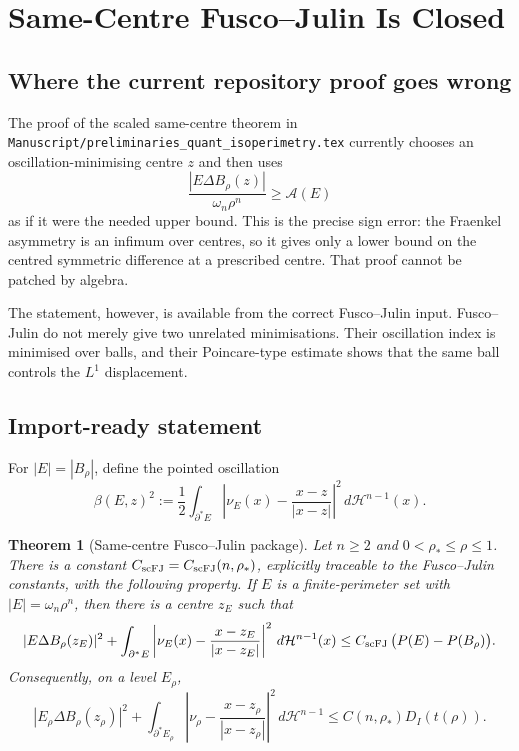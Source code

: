 \documentclass[11pt]{article}
\newtheorem{theorem}{Theorem}[section]
\theoremstyle{definition}
\newcommand{\Fr}{\mathcal A}
\newcommand{\HH}{\mathcal H}
\newcommand{\rstar}{\rho_*}
\begin{document}
\section{Same-Centre Fusco--Julin Is Closed}

\subsection{Where the current repository proof goes wrong}

The proof of the scaled same-centre theorem in
\texttt{Manuscript/preliminaries\_quant\_isoperimetry.tex} currently chooses
an oscillation-minimising centre \(z\) and then uses
\[
   \frac{|E\Delta B_\rho(z)|}{\omega_n\rho^n}\ge \Fr(E)
\]
as if it were the needed upper bound.  This is the precise sign error: the
Fraenkel asymmetry is an infimum over centres, so it gives only a lower bound
on the centred symmetric difference at a prescribed centre.  That proof
cannot be patched by algebra.

The statement, however, is available from the correct Fusco--Julin input.
Fusco--Julin do not merely give two unrelated minimisations.  Their
oscillation index is minimised over balls, and their Poincare-type estimate
shows that the same ball controls the \(L^1\) displacement.

\subsection{Import-ready statement}

For \(|E|=|B_\rho|\), define the pointed oscillation
\[
   \beta(E,z)^2
   :=
   \frac12\int_{\partial^*E}
   \left|\nu_E(x)-\frac{x-z}{|x-z|}\right|^2\,d\HH^{n-1}(x).
\]

\begin{theorem}[Same-centre Fusco--Julin package]\label{thm:scFJ}
Let \(n\ge2\) and \(0<\rstar\le\rho\le1\).  There is a constant
\(C_{\rm scFJ}=C_{\rm scFJ}(n,\rstar)\), explicitly traceable to the
Fusco--Julin constants, with the following property.  If
\(E\) is a finite-perimeter set with \(|E|=\omega_n\rho^n\), then there is a
centre \(z_E\) such that
\begin{equation}\label{eq:scFJ}
   |E\Delta B_\rho(z_E)|^2
   +
   \int_{\partial^*E}
   \left|\nu_E(x)-\frac{x-z_E}{|x-z_E|}\right|^2\,d\HH^{n-1}(x)
   \le
   C_{\rm scFJ}\,\bigl(P(E)-P(B_\rho)\bigr).
\end{equation}
Consequently, on a level \(E_\rho\),
\begin{equation}\label{eq:scFJ-DI}
   |E_\rho\Delta B_\rho(z_\rho)|^2
   +
   \int_{\partial^*E_\rho}
   \left|\nu_\rho-\frac{x-z_\rho}{|x-z_\rho|}\right|^2\,d\HH^{n-1}
   \le C(n,\rstar)D_I(t(\rho)).
\end{equation}
\end{theorem}
\end{document}
